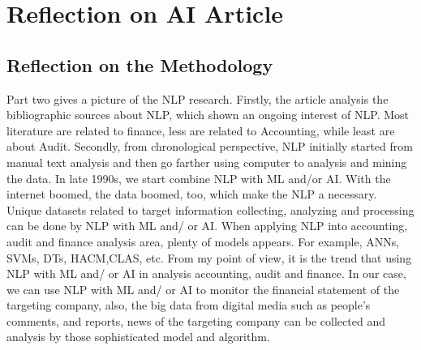 \documentclass{article}
\begin{document}
\section{Reflection on AI Article}
\subsection{Reflection on the Methodology}
Part two gives a picture of the NLP research. Firstly, the article analysis the bibliographic sources about NLP, which shown an ongoing interest of NLP. Most literature are related to finance, less are related to Accounting, while least are about Audit. Secondly, from chronological perspective, NLP initially started from manual text analysis and then go farther using computer to analysis and mining the data. In late 1990s, we start combine NLP with ML and/or AI. With the internet boomed, the data boomed, too, which make the NLP a necessary. Unique datasets related to target information collecting, analyzing and processing can be done by NLP with ML and/ or AI. When applying NLP into accounting, audit and finance analysis area, plenty of models appears. For example, ANNs, SVMs, DTs, HACM,CLAS, etc. From my point of view, it is the trend that using NLP with ML and/ or AI in analysis accounting, audit and finance. In our case, we can use NLP with ML and/ or AI to monitor the financial statement of the targeting company, also, the big data from digital media such as people’s comments, and reports, news of the targeting company can be collected and analysis by those sophisticated model and algorithm. 
\end{document}
